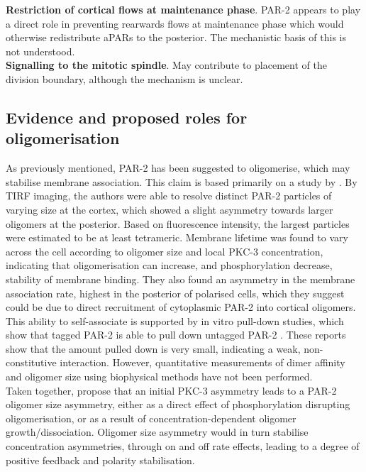 \documentclass[12pt]{"report"}
\begin{document}
\textbf{Restriction of cortical flows at maintenance phase}. PAR-2 appears to play a direct role in preventing rearwards flows at maintenance phase which would otherwise redistribute aPARs to the posterior. The mechanistic basis of this is not understood.\\

\textbf{Signalling to the mitotic spindle}. May contribute to placement of the division boundary, although the mechanism is unclear.\\


\subsection{Evidence and proposed roles for oligomerisation}

As previously mentioned, PAR-2 has been suggested to oligomerise, which may stabilise membrane association. This claim is based primarily on a study by \textcite{Arata2016}. By TIRF imaging, the authors were able to resolve distinct PAR-2 particles of varying size at the cortex, which showed a slight asymmetry towards larger oligomers at the posterior. Based on fluorescence intensity, the largest particles were estimated to be at least tetrameric. Membrane lifetime was found to vary across the cell according to oligomer size and local PKC-3 concentration, indicating that oligomerisation can increase, and phosphorylation decrease, stability of membrane binding. They also found an asymmetry in the membrane association rate, highest in the posterior of polarised cells, which they suggest could be due to direct recruitment of cytoplasmic PAR-2 into cortical oligomers.\\

This ability to self-associate is supported by in vitro pull-down studies, which show that tagged PAR-2 is able to pull down untagged PAR-2 \citep{Motegi2011, Arata2016}. These reports show that the amount pulled down is very small, indicating a weak, non-constitutive interaction. However, quantitative measurements of dimer affinity and oligomer size using biophysical methods have not been performed.\\

Taken together, \textcite{Arata2016} propose that an initial PKC-3 asymmetry leads to a PAR-2 oligomer size asymmetry, either as a direct effect of phosphorylation disrupting oligomerisation, or as a result of concentration-dependent oligomer growth/dissociation. Oligomer size asymmetry would in turn stabilise concentration asymmetries, through on and off rate effects, leading to a degree of positive feedback and polarity stabilisation.\\
\end{document}
